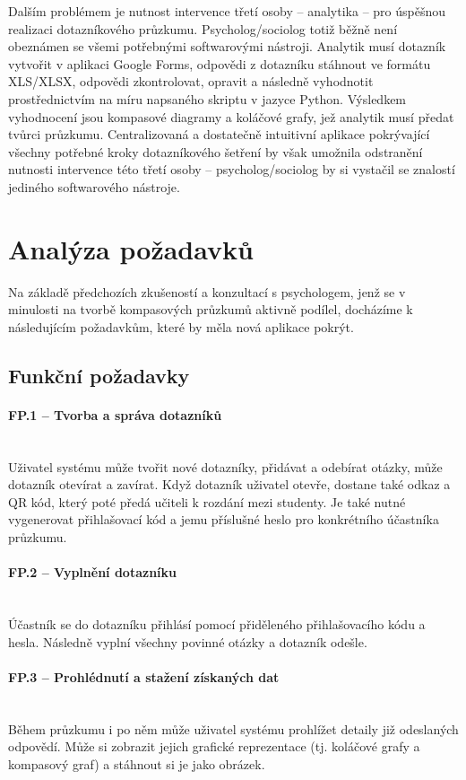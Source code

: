 Dalším problémem je nutnost intervence třetí osoby – analytika – pro úspěšnou realizaci dotazníkového průzkumu. Psycholog/sociolog totiž běžně není obeznámen se všemi potřebnými softwarovými nástroji. Analytik musí dotazník vytvořit v aplikaci Google Forms, odpovědi z dotazníku stáhnout ve formátu XLS/XLSX, odpovědi zkontrolovat, opravit a následně vyhodnotit prostřednictvím na míru napsaného skriptu v jazyce Python. Výsledkem vyhodnocení jsou kompasové diagramy a koláčové grafy, jež analytik musí předat tvůrci průzkumu. Centralizovaná a dostatečně intuitivní aplikace pokrývající všechny potřebné kroky dotazníkového šetření by však umožnila odstranění nutnosti intervence této třetí osoby – psycholog/sociolog by si vystačil se znalostí jediného softwarového nástroje.


\section{Analýza požadavků}
Na základě předchozích zkušeností a konzultací s psychologem, jenž se v minulosti na tvorbě kompasových průzkumů aktivně podílel, docházíme k následujícím požadavkům, které by měla nová aplikace pokrýt.
\subsection{Funkční požadavky}
\label{subsection:functionalreq}

\paragraph{FP.1 – Tvorba a správa dotazníků}~\\
Uživatel systému může tvořit nové dotazníky, přidávat a odebírat otázky, může dotazník otevírat a zavírat. Když dotazník uživatel otevře, dostane také odkaz a QR kód, který poté předá učiteli k rozdání mezi studenty. Je také nutné vygenerovat přihlašovací kód a jemu příslušné heslo pro konkrétního účastníka průzkumu.

\paragraph{FP.2 – Vyplnění dotazníku}~\\
Účastník se do dotazníku přihlásí pomocí přiděleného přihlašovacího kódu a hesla. Následně vyplní všechny povinné otázky a dotazník odešle.

\paragraph{FP.3 – Prohlédnutí a stažení získaných dat}~\\
Během průzkumu i po něm může uživatel systému prohlížet detaily již odeslaných odpovědí. Může si zobrazit jejich grafické reprezentace (tj. koláčové grafy a kompasový graf) a stáhnout si je jako obrázek.

